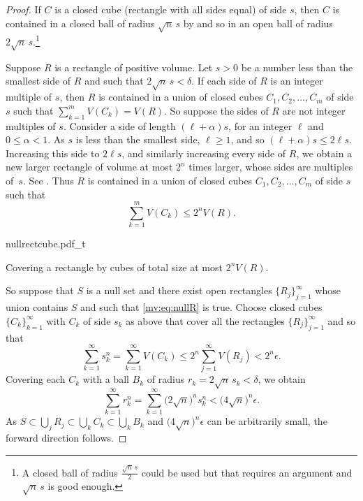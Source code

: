 \begin{proof}
If $C$ is a closed cube (rectangle with all sides equal) of side $s$,
then $C$ is contained in a closed ball of radius
$\sqrt{n}\, s$ by  and so
in an open ball of radius $2 \sqrt{n}\, s$.\footnote{%
A closed ball of radius $\frac{\sqrt{n}\,s}{2}$
could be used but that requires an argument and 
$\sqrt{n}\, s$ is good enough.}

Suppose $R$ is a rectangle of positive volume.
Let $s > 0$ be a number less than the smallest side of $R$ and
such that $2\sqrt{n} \, s < \delta$.
If each side of $R$ is an integer multiple of $s$, then $R$ is
contained in a union of closed cubes
$C_1, C_2, \ldots, C_m$ of side $s$ such that
$\sum_{k=1}^m V(C_k) = V(R)$.  So suppose the sides
of $R$ are not integer multiples of $s$.
Consider a side of length $(\ell+\alpha) s$, for
an integer $\ell$ and $0 \leq \alpha < 1$.  As $s$ is less than the smallest
side, $\ell \geq 1$, and so $(\ell+\alpha)s \leq 2\ell s$.
Increasing this side to $2\ell s$,
and similarly increasing every side of $R$, we obtain a new larger
rectangle of volume at most $2^n$ times larger, whose sides are
multiples of~$s$.  See .
Thus $R$ is contained in a union of
closed cubes $C_1, C_2, \ldots, C_m$ of side $s$ such that
\begin{equation*}
\sum_{k=1}^m V(C_k) \leq 2^n V(R) .
\end{equation*}

\begin{myfigureht}
{nullrectcube.pdf_t}
\caption{Covering a rectangle by cubes of total size at most $2^n V(R)$.\label{fig:nullrectcube}}
\end{myfigureht}

So suppose that $S$ is a null set and
there exist open rectangles $\{ R_j \}_{j=1}^\infty$ whose union contains $S$ and such that
\eqref{mv:eq:nullR} is true.  Choose closed
cubes $\{ C_k \}_{k=1}^\infty$ with $C_k$ of side $s_k$ as above that cover
all the rectangles $\{ R_j \}_{j=1}^\infty$ and so that
\begin{equation*}
\sum_{k=1}^\infty s_k^n =
\sum_{k=1}^\infty V(C_k) \leq
2^n \sum_{j=1}^\infty V(R_j)
< 2^n \epsilon.
\end{equation*}
Covering each $C_k$ with a ball $B_k$ of radius $r_k = 2\sqrt{n} \, s_k < \delta$,
we obtain 
\begin{equation*}
\sum_{k=1}^\infty r_k^n
=
\sum_{k=1}^\infty {\bigl(2\sqrt{n}\bigr)}^n s_k^n
<
{\bigl(4\sqrt{n}\bigr)}^n \epsilon .
\end{equation*}
As $S \subset\bigcup_{j} R_j \subset \bigcup_{k} C_k \subset \bigcup_{k}
B_k$ and ${\bigl(4\sqrt{n}\bigr)}^n \epsilon$ can be arbitrarily small,
the forward direction follows.


\end{proof}
